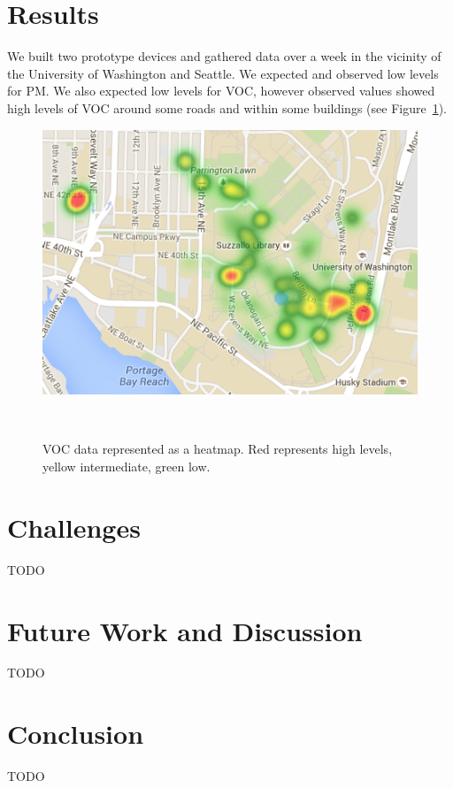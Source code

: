 \documentclass{sigchi}
\begin{document}
\section{Results}
We built two prototype devices and gathered data over a week in the vicinity of the University of Washington and Seattle.
We expected and observed low levels for PM.
We also expected low levels for VOC, however observed values showed high levels of VOC around some roads and within some buildings (see Figure~\ref{fig:voc heatmap}).
\begin{figure}
    \centering
    \includegraphics[width=0.9\columnwidth]{figures/VOC-Heatmap.png}
    \caption{VOC data represented as a heatmap.  Red represents high levels, yellow intermediate, green low.}
    ~\label{fig:voc heatmap}
\end{figure}

\section{Challenges}
TODO

\section{Future Work and Discussion}
TODO

\section{Conclusion}
TODO

\balance{}



\end{document}
